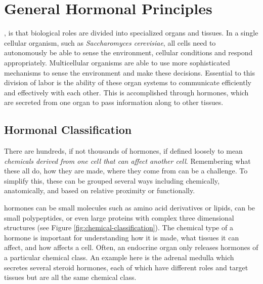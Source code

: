 \documentclass{tufte-handout}
\begin{document}
\section{General Hormonal Principles}
, is that biological roles are divided into specialized organs and tissues.  In a single cellular organism, such as \textit{Saccharomyces cerevisiae}, all cells need to autonomously be able to sense the environment, cellular conditions and respond appropriately.  Multicellular organisms are able to use more sophisticated mechanisms to sense the environment and make these decisions.  Essential to this division of labor is the ability of these organ systems to communicate efficiently and effectively with each other.  This is accomplished through hormones, which are secreted from one organ to pass information along to other tissues.

\subsection{Hormonal Classification}

There are hundreds, if not thousands of hormones, if defined loosely to mean \emph{chemicals derived from one cell that can affect another cell}.  Remembering what these all do, how they are made, where they come from can be a challenge.  To simplify this, these can be grouped several ways including chemically, anatomically, and based on relative proximity or functionally.  

 hormones can be small molecules such as amino acid derivatives or lipids, can be small polypeptides, or even large proteins with complex three dimensional structures (see Figure \ref{fig:chemical-classification}).  The chemical type of a hormone is important for understanding how it is made, what tissues it can affect, and how affects a cell.  Often, an endocrine organ only releases hormones of a particular chemical class.  An example here is the adrenal medulla which secretes several steroid hormones, each of which have different roles and target tissues but are all the same chemical class.
\end{document}
